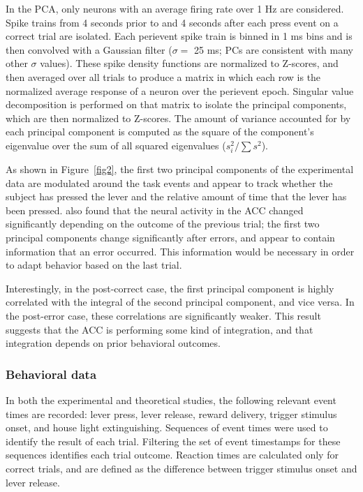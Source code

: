 \documentclass[11pt]{article}
\begin{document}
In the PCA, only neurons with an average
firing rate over 1 Hz are considered.
Spike trains from 4 seconds prior to and 4 seconds after
each press event on a correct trial are isolated.
Each perievent spike train is binned in 1 ms bins and is then
convolved with a Gaussian filter ($\sigma = $ 25 ms;
PCs are consistent with many other $\sigma$ values).
These spike density functions
are normalized to Z-scores,
and then averaged over all trials to
produce a matrix in which each row is
the normalized average response of a neuron
over the perievent epoch.
Singular value decomposition
is performed on that matrix
to isolate the principal components,
which are then normalized to Z-scores.
The amount of variance accounted for
by each principal component
is computed as the square of the component's eigenvalue
over the sum of all squared eigenvalues
($s_i^2 / \sum s^2$).

As shown in Figure~\ref{fig2},
the first two principal components
of the experimental data
are modulated around the task events
and appear to track
whether the subject has pressed the lever and
the relative amount of time
that the lever has been pressed.
\citeauthor{Narayanan2009} also found that the neural activity
in the ACC changed significantly depending on
the outcome of the previous trial;
the first two principal components
change significantly after errors,
and appear to contain information that an error occurred.
This information would be necessary
in order to adapt behavior based on the last trial.

Interestingly, in the post-correct case,
the first principal component
is highly correlated with the integral
of the second principal component,
and vice versa.
In the post-error case,
these correlations are significantly weaker.
This result suggests that
the ACC is performing some kind of integration,
and that integration depends
on prior behavioral outcomes.

\subsubsection{Behavioral data}

In both the experimental and theoretical studies,
the following relevant event times are recorded:
lever press, lever release, reward delivery,
trigger stimulus onset, and house light extinguishing.
Sequences of event times were used to
identify the result of each trial.
Filtering the set of event timestamps
for these sequences identifies each trial outcome.
Reaction times are calculated
only for correct trials,
and are defined as the difference between
trigger stimulus onset and lever release.
\end{document}
